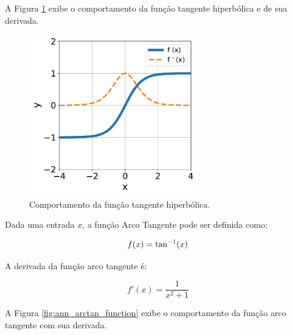 A Figura \ref{fig:ann_tanh_function} exibe o comportamento da função tangente hiperbólica e de sua derivada.

\begin{figure}[H]
    \centering
    \includegraphics[width=0.65\textwidth]{figs/ann_tanh_function.pdf}

    \caption{Comportamento da função tangente hiperbólica.}
    \label{fig:ann_tanh_function}
\end{figure}


\linebreak
\newpage


\begin{definition}
    Dada uma entrada $x$, a função Arco Tangente pode ser definida como:

    \begin{equation}
        f(x) = \text{tan}^{-1}(x)
        \vspace{0.2cm}
        \label{eq:ann_arctan_function}
    \end{equation}

    A derivada da função arco tangente é:

    \begin{equation}
        f'(x) = \dfrac{1}{x^{2} + 1}
        \label{eq:ann_arctan_function_dy}
    \end{equation}

\end{definition}

A Figura \ref{fig:ann_arctan_function} exibe o comportamento da função arco tangente com sua derivada.


